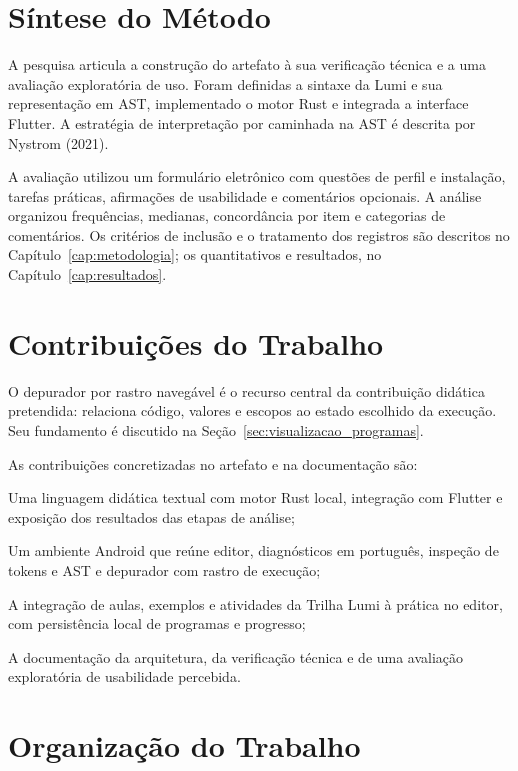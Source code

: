 \documentclass[
    12pt
    ,oneside
    ,a4paper
    ,chapter=TITLE
    ,section=TITLE
    ,sumario=abnt-6027-2012]{abntex2}
\begin{document}
\section{Síntese do Método}

A pesquisa articula a construção do artefato à sua verificação técnica e a
uma avaliação exploratória de uso. Foram definidas a sintaxe da Lumi e sua
representação em AST, implementado o motor Rust e integrada a interface Flutter.
A estratégia de interpretação por caminhada na AST é descrita por Nystrom (2021).

A avaliação utilizou um formulário eletrônico com questões de perfil e
instalação, tarefas práticas, afirmações de usabilidade e comentários opcionais.
A análise organizou frequências, medianas, concordância por item e categorias
de comentários. Os critérios de inclusão e o tratamento dos registros são
descritos no Capítulo~\ref{cap:metodologia}; os quantitativos e resultados,
no Capítulo~\ref{cap:resultados}.

\section{Contribuições do Trabalho}

O depurador por rastro navegável é o recurso central da contribuição didática
pretendida: relaciona código, valores e escopos ao estado escolhido da execução.
Seu fundamento é discutido na Seção~\ref{sec:visualizacao_programas}.

As contribuições concretizadas no artefato e na documentação são:

\begin{alineas}
    \item Uma linguagem didática textual com motor Rust local, integração com Flutter e exposição dos resultados das etapas de análise;
    \item Um ambiente Android que reúne editor, diagnósticos em português, inspeção de tokens e AST e depurador com rastro de execução;
    \item A integração de aulas, exemplos e atividades da Trilha Lumi à prática no editor, com persistência local de programas e progresso;
    \item A documentação da arquitetura, da verificação técnica e de uma avaliação exploratória de usabilidade percebida.
\end{alineas}

\section{Organização do Trabalho}
\end{document}
